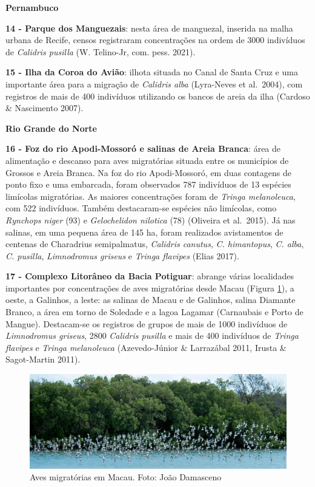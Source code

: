 \documentclass[
  oneside]{scrbook}
\begin{document}
\textbf{Pernambuco}

\textbf{14 - Parque dos Manguezais}: nesta área de manguezal, inserida na malha urbana de Recife, censos registraram concentrações na ordem de 3000 indivíduos de \emph{Calidris pusilla} (W. Telino-Jr, com. pess. 2021).

\textbf{15 - Ilha da Coroa do Avião}: ilhota situada no Canal de Santa Cruz e uma importante área para a migração de \emph{Calidris alba} (Lyra-Neves et al.~2004), com registros de mais de 400 indivíduos utilizando os bancos de areia da ilha (Cardoso \& Nascimento 2007).

\textbf{Rio Grande do Norte}

\textbf{16 - Foz do rio Apodi-Mossoró e salinas de Areia Branca}: área de alimentação e descanso para aves migratórias situada entre os municípios de Grossos e Areia Branca. Na foz do rio Apodi-Mossoró, em duas contagens de ponto fixo e uma embarcada, foram observados 787 indivíduos de 13 espécies limícolas migratórias. As maiores concentrações foram de \emph{Tringa melanoleuca}, com 522 indivíduos. Também destacaram-se espécies não limícolas, como \emph{Rynchops niger} (93) e \emph{Gelochelidon nilotica} (78) (Oliveira et al.~2015). Já nas salinas, em uma pequena área de 145 ha, foram realizados avistamentos de centenas de Charadrius semipalmatus, \emph{Calidris canutus}, \emph{C. himantopus}, \emph{C. alba}, \emph{C. pusilla}, \emph{Limnodromus griseus} e \emph{Tringa flavipes} (Elias 2017).

\textbf{17 - Complexo Litorâneo da Bacia Potiguar}: abrange várias localidades importantes por concentrações de aves migratórias desde Macau (Figura \ref{fig:23}), a oeste, a Galinhos, a leste: as salinas de Macau e de Galinhos, salina Diamante Branco, a área em torno de Soledade e a lagoa Lagamar (Carnaubais e Porto de Mangue). Destacam-se os registros de grupos de mais de 1000 indivíduos de \emph{Limnodromus griseus}, 2800 \emph{Calidris pusilla} e mais de 400 indivíduos de \emph{Tringa flavipes} e \emph{Tringa melanoleuca} (Azevedo-Júnior \& Larrazábal 2011, Irusta \& Sagot-Martin 2011).

\begin{figure}[H]

{\centering \includegraphics[width=0.75\linewidth]{imagens/cap07/Figura_7.3} 

}

\caption{Aves migratórias em Macau. Foto: João Damasceno}\label{fig:23}
\end{figure}
\end{document}
